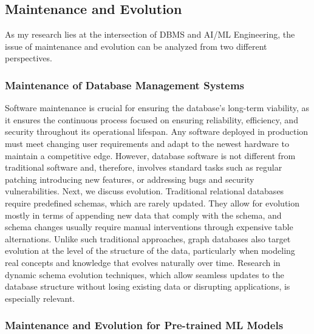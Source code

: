 \documentclass[a4paper, 11pt]{article}
\begin{document}
\subsection{Maintenance and Evolution}

As my research lies at the intersection of DBMS and AI/ML Engineering, the issue of maintenance and evolution can be analyzed from two different perspectives. 

\subsubsection{Maintenance of Database Management Systems}

Software maintenance is crucial for ensuring the database's long-term viability, as it ensures the continuous process focused on ensuring reliability, efficiency, and security throughout its operational lifespan. Any software deployed in production must meet changing user requirements and adapt to the newest hardware to maintain a competitive edge. However, database software is not different from traditional software and, therefore, involves standard tasks such as regular patching introducing new features, or addressing bugs and security vulnerabilities. Next, we discuss evolution. Traditional relational databases require predefined schemas, which are rarely updated. They allow for evolution mostly in terms of appending new data that comply with the schema, and schema changes usually require manual interventions through expensive table alternations. Unlike such traditional approaches, graph databases also target evolution at the level of the structure of the data, particularly when modeling real concepts and knowledge that evolves naturally over time. Research in dynamic schema evolution techniques, which allow seamless updates to the database structure without losing existing data or disrupting applications, is especially relevant. 

\subsubsection{Maintenance and Evolution for Pre-trained ML Models}
\end{document}

